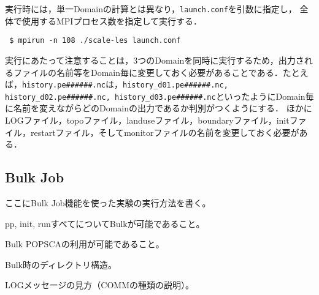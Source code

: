 実行時には，単一Domainの計算とは異なり，\verb|launch.conf|を引数に指定し，
全体で使用するMPIプロセス数を指定して実行する．
\begin{verbatim}
 $ mpirun -n 108 ./scale-les launch.conf
\end{verbatim}

実行にあたって注意することは，3つのDomainを同時に実行するため，出力されるファイルの名前等をDomain毎に変更しておく必要があることである．たとえば，\verb|history.pe######.nc|は，\verb|history_d01.pe######.nc, history_d02.pe######.nc, history_d03.pe######.nc|といったようにDomain毎に名前を変えながらどのDomainの出力であるか判別がつくようにする．
ほかにLOGファイル，topoファイル，landuseファイル，boundaryファイル，initファイル，restartファイル，そしてmonitorファイルの名前を変更しておく必要がある．


\subsection{Bulk Job}

ここにBulk Job機能を使った実験の実行方法を書く。

pp, init, runすべてについてBulkが可能であること。

Bulk POPSCAの利用が可能であること。

Bulk時のディレクトリ構造。

LOGメッセージの見方（COMMの種類の説明）。

